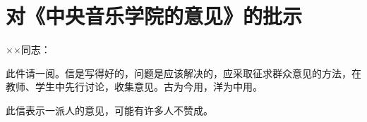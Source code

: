 \section[对《中央音乐学院的意见》的批示（一九六四年九月二十七日）]{对《中央音乐学院的意见》的批示}


××同志：

此件请一阅。信是写得好的，问题是应该解决的，应采取征求群众意见的方法，在教师、学生中先行讨论，收集意见。古为今用，洋为中用。

此信表示一派人的意见，可能有许多人不赞成。


